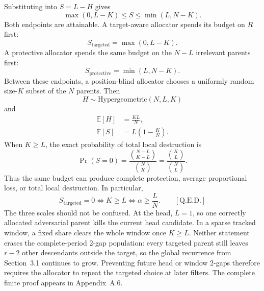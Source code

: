 Substituting into $S=L-H$ gives
\begin{equation*}
\max(0,L-K)
\le S\le
\min(L,N-K).
\end{equation*}
Both endpoints are attainable. A target-aware allocator spends its budget on $R$ first:
\begin{equation*}
S_{\mathrm{targeted}}=\max(0,L-K).
\end{equation*}
A protective allocator spends the same budget on the $N-L$ irrelevant parents first:
\begin{equation*}
S_{\mathrm{protective}}=\min(L,N-K).
\end{equation*}
Between these endpoints, a position-blind allocator chooses a uniformly random size-$K$ subset of the $N$ parents. Then
\begin{equation*}
H\sim\text{Hypergeometric}(N,L,K)
\end{equation*}
and
\begin{equation*}
\begin{aligned}
\mathbb E[H]&=\frac{KL}{N},\\
\mathbb E[S]&=L\left(1-\frac KN\right).
\end{aligned}
\end{equation*}
When $K\ge L$, the exact probability of total local destruction is
\begin{equation*}
\Pr(S=0)
=
\frac{\binom{N-L}{K-L}}{\binom NK}
=
\frac{\binom KL}{\binom NL}.
\end{equation*}
Thus the same budget can produce complete protection, average proportional loss, or total local destruction. In particular,
\begin{equation*}
S_{\mathrm{targeted}}=0
\Longleftrightarrow
K\ge L
\Longleftrightarrow
\alpha\ge\frac LN.
\qquad[\text{Q.E.D.}]
\end{equation*}
The three scales should not be confused. At the head, $L=1$, so one correctly allocated adversarial parent kills the current head candidate. In a sparse tracked window, a fixed share clears the whole window once $K\ge L$. Neither statement erases the complete-period 2-gap population: every targeted parent still leaves $r-2$ other descendants outside the target, so the global recurrence from Section~3.1 continues to grow. Preventing future head or window 2-gaps therefore requires the allocator to repeat the targeted choice at later filters.
The complete finite proof appears in Appendix~A.6.
